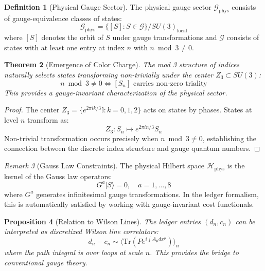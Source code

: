 \documentclass[11pt]{article}
\numberwithin{equation}{section}
\newtheorem{theorem}{Theorem}[section]
\newtheorem{proposition}[theorem]{Proposition}
\theoremstyle{definition}
\newtheorem{definition}[theorem]{Definition}
\theoremstyle{remark}
\newtheorem{remark}[theorem]{Remark}
\begin{document}
\begin{definition}[Physical Gauge Sector]
The physical gauge sector $\mathcal{G}_{\text{phys}}$ consists of gauge-equivalence classes of states:
\begin{equation}
\mathcal{G}_{\text{phys}} = \{[S] : S \in \mathcal{G}\} / SU(3)_{\text{local}}
\end{equation}
where $[S]$ denotes the orbit of $S$ under gauge transformations and $\mathcal{G}$ consists of states with at least one entry at index $n$ with $n \bmod 3 \neq 0$.
\end{definition}

\begin{theorem}[Emergence of Color Charge]
The mod 3 structure of indices naturally selects states transforming non-trivially under the center $Z_3 \subset SU(3)$:
\begin{equation}
n \bmod 3 \neq 0 \iff [S_n] \text{ carries non-zero triality}
\end{equation}
This provides a gauge-invariant characterization of the physical sector.
\end{theorem}

\begin{proof}
The center $Z_3 = \{e^{2\pi i k/3} \mathbb{I} : k = 0,1,2\}$ acts on states by phases. States at level $n$ transform as:
\begin{equation}
Z_3: S_n \mapsto e^{2\pi i n/3} S_n
\end{equation}
Non-trivial transformation occurs precisely when $n \bmod 3 \neq 0$, establishing the connection between the discrete index structure and gauge quantum numbers.
\end{proof}

\begin{remark}[Gauss Law Constraints]
The physical Hilbert space $\mathcal{H}_{\text{phys}}$ is the kernel of the Gauss law operators:
\begin{equation}
G^a |S\rangle = 0, \quad a = 1,\ldots,8
\end{equation}
where $G^a$ generates infinitesimal gauge transformations. In the ledger formalism, this is automatically satisfied by working with gauge-invariant cost functionals.
\end{remark}

\begin{proposition}[Relation to Wilson Lines]
The ledger entries $(d_n, c_n)$ can be interpreted as discretized Wilson line correlators:
\begin{equation}
d_n - c_n \sim \langle \text{Tr}(P e^{i\int A_\mu dx^\mu}) \rangle_n
\end{equation}
where the path integral is over loops at scale $n$. This provides the bridge to conventional gauge theory.
\end{proposition}
\end{document}
